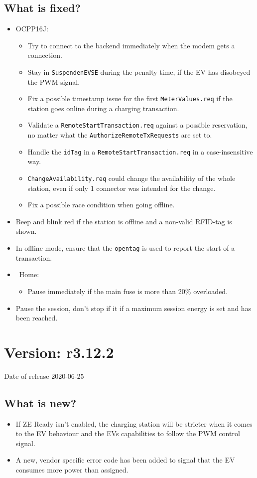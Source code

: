 \documentclass{scrartcl}
\begin{document}
\subsection*{What is fixed?}
\begin{itemize}
\item OCPP16J:
  \begin{itemize}
  \item Try to connect to the backend immediately when the modem gets a
    connection.
  \item Stay in \verb|SuspendenEVSE| during the penalty time, if the EV has
    disobeyed the PWM-signal.
  \item Fix a possible timestamp issue for the first \verb|MeterValues.req| if
    the station goes online during a charging transaction.
  \item Validate a \verb|RemoteStartTransaction.req| against a possible
    reservation, no matter what the \verb|AuthorizeRemoteTxRequests| are set
    to.
  \item Handle the \verb|idTag| in a \verb|RemoteStartTransaction.req| in a
    case-insensitive way.
  \item \verb|ChangeAvailability.req| could change the availability of the
    whole station, even if only 1 connector was intended for the change.
  \item Fix a possible race condition when going offline.
  \end{itemize}
\item Beep and blink red if the station is offline and a non-valid RFID-tag is
  shown.
\item In offline mode, ensure that the \verb|opentag| is used to report the
  start of a transaction.
\item \nanogrid\ Home:
  \begin{itemize}
  \item Pause immediately if the main fuse is more than $20\%$ overloaded.
  \end{itemize}
\item Pause the session, don't stop if it if a maximum session energy is set
  and has been reached.
\end{itemize}

\section{Version: r3.12.2}
Date of release 2020-06-25
\subsection*{What is new?}
\begin{itemize}
\item If ZE Ready isn't enabled, the charging station will be stricter when it
  comes to the EV behaviour and the EVs capabilities to follow the PWM control signal.
\item A new, vendor specific error code has been added to signal that the EV
  consumes more power than assigned.
\end{itemize}
\end{document}

